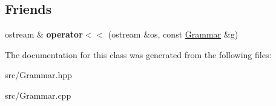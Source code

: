 \subsection*{Friends}
\begin{DoxyCompactItemize}
\item 
\mbox{\label{class_grammar_ad24325b2deffa53cd92880f7e7c6a157}} 
ostream \& {\bfseries operator$<$$<$} (ostream \&os, const \hyperlink{class_grammar}{Grammar} \&g)
\end{DoxyCompactItemize}


The documentation for this class was generated from the following files\+:\begin{DoxyCompactItemize}
\item 
src/Grammar.\+hpp\item 
src/Grammar.\+cpp\end{DoxyCompactItemize}
